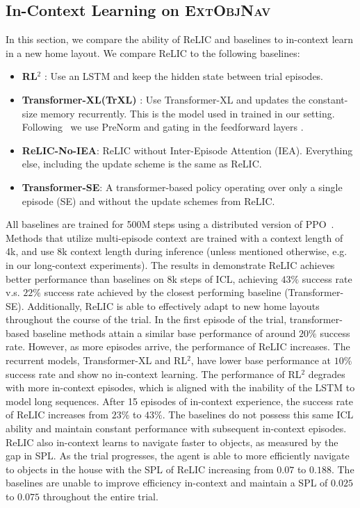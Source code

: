 \documentclass{article}
\newcommand{\method}{ReLIC\xspace}
\newcommand{\rls}{RL$^{2}$\xspace}
\newcommand{\semethod}{Transformer-SE\xspace}
\newcommand{\ieafmethod}{\method-No-IEA\xspace}
\newcommand{\trxl}{Transformer-XL\xspace}
\newcommand{\task}{\textsc{ExtObjNav}\xspace}
\begin{document}
\subsection{In-Context Learning on \task}
\label{sec:icl_on_task}
In this section, we compare the ability of \method and baselines to in-context learn in a new home layout. We compare \method to the following baselines:
\begin{itemize}[itemsep=2pt,topsep=0pt,parsep=0pt,partopsep=0pt,parsep=0pt,leftmargin=*]
  \item \textbf{\rls} \cite{duan2016rl}: Use an LSTM and keep the hidden state between trial episodes.
  \item \textbf{\trxl (TrXL)} \cite{dai2019transformerxl}: Use Transformer-XL and updates the constant-size memory recurrently. This is the model used in \cite{team2023human} trained in our setting. Following~\cite{team2023human} we use PreNorm \citep{gtrxl} and gating in the feedforward layers \citep{shazeer2020glu}.
  \item \textbf{\ieafmethod}: \method without Inter-Episode Attention (IEA). Everything else, including the update scheme is the same as \method.
  \item \textbf{\semethod}: A transformer-based policy operating over only a single episode (SE) and without the update schemes from \method.
\end{itemize}
All baselines are trained for 500M steps using a distributed version of PPO~\citep{wijmans2019dd}. Methods that utilize multi-episode context are trained with a context length of 4k, and use 8k context length during inference (unless mentioned otherwise, e.g. in our long-context experiments). The results in  demonstrate \method achieves better performance than baselines on 8k steps of ICL, achieving $ 43\%$ success rate v.s.  $ 22 \%$ success rate achieved by the closest performing baseline (\semethod).
Additionally, \method is able to effectively adapt to new home layouts throughout the course of the trial. In the first episode of the trial, transformer-based baseline methods attain a similar base performance of around $ 20 \%$ success rate. However, as more episodes arrive, the performance of \method increases. The recurrent models, Transformer-XL and \rls, have lower base performance at $10\%$ success rate and show no in-context learning.
The performance of \rls degrades with more in-context episodes, which is aligned with the inability of the LSTM to model long sequences.
After 15 episodes of in-context experience, the success rate of \method increases from $ 23\%$ to $ 43\%$.
The baselines do not possess this same ICL ability and maintain constant performance with subsequent in-context episodes.
\method also in-context learns to navigate faster to objects, as measured by the  gap in SPL.
As the trial progresses, the agent is able to more efficiently navigate to objects in the house with the SPL of \method increasing from $ 0.07$ to $ 0.188$.
The baselines are unable to improve efficiency in-context and maintain a SPL of $ 0.025$ to $ 0.075$ throughout the entire trial.
\vspace{-5pt}
\end{document}

